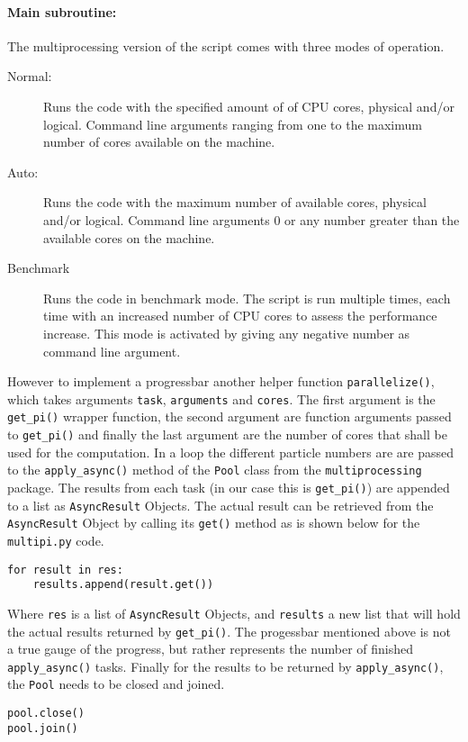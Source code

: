 \documentclass{aa}
\begin{document}
\paragraph{Main subroutine:} The multiprocessing version of the script comes with three modes
of operation.
\begin{description}
    \item[Normal:] Runs the code with the specified amount of of CPU cores, physical and/or
        logical. Command line arguments ranging from one to the maximum number of cores
        available on the machine.
    \item[Auto:] Runs the code with the maximum number of available cores, physical and/or
        logical. Command line arguments \(0\) or any number greater than the available cores on
        the machine.
    \item[Benchmark] Runs the code in benchmark mode. The script is run multiple times, each
        time with an increased number of CPU cores to assess the performance increase. This
        mode is activated by giving any negative number as command line argument.
\end{description}
However to implement a progressbar another helper function \verb+parallelize()+, which takes
arguments \verb+task+, \verb+arguments+ and \verb+cores+. The first argument is the
\verb+get_pi()+ wrapper function, the second argument are function arguments passed to
\verb+get_pi()+ and finally the last argument are the number of cores that shall be used for
the computation. In a loop the different particle numbers are are passed to the
\verb+apply_async()+ method of the \verb+Pool+ class from the \verb+multiprocessing+ package.
The results from each task (in our case this is \verb+get_pi()+) are appended to a list as
\verb+AsyncResult+ Objects. The actual result can be retrieved from the \verb+AsyncResult+
Object by calling its \verb+get()+ method as is shown below for the \verb+multipi.py+ code.
\begin{lstlisting}[firstnumber=314]
for result in res:
    results.append(result.get())
\end{lstlisting}
Where \verb+res+ is a list of \verb+AsyncResult+ Objects, and \verb+results+ a new list that
will hold the actual results returned by \verb+get_pi()+. The progessbar mentioned above is not
a true gauge of the progress, but rather represents the number of finished \verb+apply_async()+
tasks. Finally for the results to be returned by \verb+apply_async()+, the \verb+Pool+ needs to
be closed and joined.
\begin{lstlisting}[firstnumber=243]
pool.close()
pool.join()
\end{lstlisting}
\end{document}
